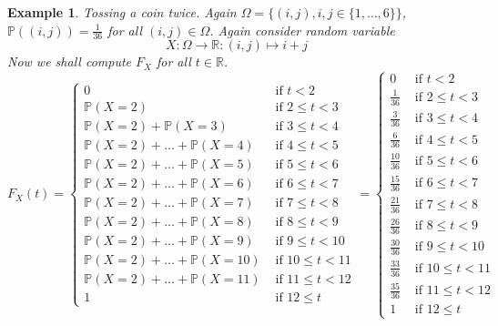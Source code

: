 \documentclass[12pt]{article}
\newtheorem{example}[theorem]{Example}
\begin{document}
\begin{example} Tossing a coin twice. Again $\Omega=\{(i,j), i,j\in\{1,\ldots,6\}\}$, $\mathbb{P}((i,j))=\frac{1}{36}$ for all $(i,j)\in \Omega$. Again consider random variable
$$
X:\Omega\to\mathbb{R}:(i,j)\mapsto i+j 
$$
Now we shall compute $F_X$ for all $t\in\mathbb{R}$.
$$
F_X(t)=
\begin{cases}
0 & \mbox { if }t < 2 \\
\mathbb{P}(X=2) & \mbox { if } 2 \leq t < 3 \\
\mathbb{P}(X=2)+\mathbb{P}(X=3) & \mbox { if } 3 \leq t < 4 \\
\mathbb{P}(X=2)+\ldots+\mathbb{P}(X=4) & \mbox { if } 4 \leq t < 5 \\
\mathbb{P}(X=2)+\ldots+\mathbb{P}(X=5) & \mbox { if } 5 \leq t < 6 \\
\mathbb{P}(X=2)+\ldots+\mathbb{P}(X=6) & \mbox { if } 6 \leq t < 7 \\
\mathbb{P}(X=2)+\ldots+\mathbb{P}(X=7) & \mbox { if } 7 \leq t < 8 \\
\mathbb{P}(X=2)+\ldots+\mathbb{P}(X=8) & \mbox { if } 8 \leq t < 9 \\
\mathbb{P}(X=2)+\ldots+\mathbb{P}(X=9) & \mbox { if } 9 \leq t < 10 \\
\mathbb{P}(X=2)+\ldots+\mathbb{P}(X=10) & \mbox { if } 10 \leq t < 11 \\
\mathbb{P}(X=2)+\ldots+\mathbb{P}(X=11) & \mbox { if } 11 \leq t < 12 \\
1 & \mbox { if }12 \leq t
\end{cases}
=
\begin{cases}
0 & \mbox { if }t < 2 \\
\frac{1}{36} & \mbox { if } 2 \leq t < 3 \\
\frac{3}{36} & \mbox { if } 3 \leq t < 4 \\
\frac{6}{36} & \mbox { if } 4 \leq t < 5 \\
\frac{10}{36} & \mbox { if } 5 \leq t < 6 \\
\frac{15}{36} & \mbox { if } 6 \leq t < 7 \\
\frac{21}{36} & \mbox { if } 7 \leq t < 8 \\
\frac{26}{36} & \mbox { if } 8 \leq t < 9 \\
\frac{30}{36} & \mbox { if } 9 \leq t < 10 \\
\frac{33}{36} & \mbox { if } 10 \leq t < 11 \\
\frac{35}{36} & \mbox { if } 11 \leq t < 12 \\
1 & \mbox { if }12 \leq t
\end{cases}
$$
\end{example}
\end{document}
